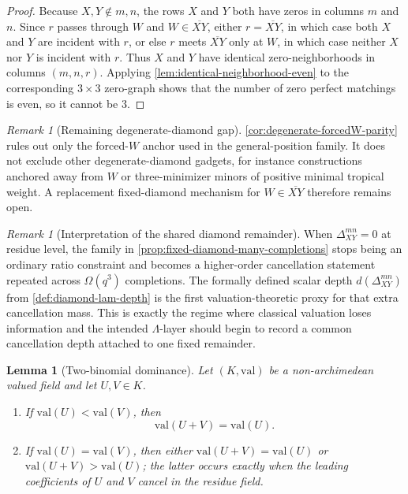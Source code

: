 \documentclass[11pt]{amsart}
\numberwithin{equation}{section}
\theoremstyle{plain}
\newtheorem{lemma}[theorem]{Lemma}
\theoremstyle{definition}
\theoremstyle{remark}
\newtheorem{remark}[theorem]{Remark}
\newcommand{\val}{\mathrm{val}}
\newcommand{\Lam}{\Lambda}
\begin{document}
\begin{proof}
Because $X,Y\notin m,n$, the rows $X$ and $Y$ both have zeros in columns $m$ and $n$. Since $r$ passes through $W$ and
$W\in\overline{XY}$, either $r=\overline{XY}$, in which case both $X$ and $Y$ are incident with $r$, or else $r$ meets
$\overline{XY}$ only at $W$, in which case neither $X$ nor $Y$ is incident with $r$. Thus $X$ and $Y$ have identical zero-neighborhoods in
columns $(m,n,r)$. Applying \cref{lem:identical-neighborhood-even} to the corresponding $3\times3$ zero-graph shows that the number of
zero perfect matchings is even, so it cannot be $3$.
\end{proof}

\begin{remark}[Remaining degenerate-diamond gap]
\cref{cor:degenerate-forcedW-parity} rules out only the forced-$W$ anchor used in the general-position family. It does not exclude other
degenerate-diamond gadgets, for instance constructions anchored away from $W$ or three-minimizer minors of positive minimal tropical
weight. A replacement fixed-diamond mechanism for $W\in \overline{XY}$ therefore remains open.
\end{remark}

\begin{remark}[Interpretation of the shared diamond remainder]
When $\Delta_{XY}^{mn}=0$ at residue level, the family in \cref{prop:fixed-diamond-many-completions} stops being an ordinary ratio
constraint and becomes a higher-order cancellation statement repeated across $\Omega(q^3)$ completions. The formally defined scalar depth
$d(\Delta_{XY}^{mn})$ from \cref{def:diamond-lam-depth} is the first valuation-theoretic proxy for that extra cancellation mass. This is
exactly the regime where classical valuation loses information and the intended $\Lam$-layer should begin to record a common cancellation
depth attached to one fixed remainder.
\end{remark}

\begin{lemma}[Two-binomial dominance]
\label{lem:two-binomial-dominance}
Let $(K,\val)$ be a non-archimedean valued field and let $U,V\in K$.
\begin{enumerate}[leftmargin=2em]
  \item If $\val(U)<\val(V)$, then
  \[
  \val(U+V)=\val(U).
  \]
  \item If $\val(U)=\val(V)$, then either $\val(U+V)=\val(U)$ or $\val(U+V)>\val(U)$; the latter occurs exactly when the leading coefficients of $U$ and $V$ cancel in the residue field.
\end{enumerate}
\end{lemma}
\end{document}
